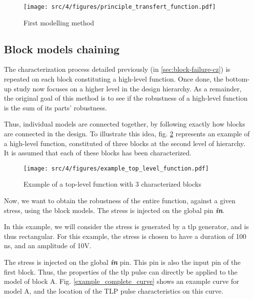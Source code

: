\begin{figure}[!h]
  \centering
  \texttt{[image: src/4/figures/principle\_transfert\_function.pdf]}
  \caption{First modelling method}
  \label{fig:principle-transfert-func}
\end{figure}


\subsection{Block models chaining}
\label{sec:block-chaining}

The characterization process detailed previously (in \ref{sec:block-failure-cz}) is repeated on each block constituting a high-level function.
Once done, the bottom-up study now focuses on a higher level in the design hierarchy.
As a remainder, the original goal of this method is to see if the robustness of a high-level function is the sum of its parts' robustness.

Thus, individual models are connected together, by following exactly how blocks are connected in the design.
To illustrate this idea, fig. \ref{example_toplevel_function} represents an example of a high-level function, constituted of three blocks at the second level of hierarchy.
It is assumed that each of these blocks has been characterized.


\begin{figure}[!h]
  \centering
  \texttt{[image: src/4/figures/example\_top\_level\_function.pdf]}
  \caption{Example of a top-level function with 3 characterized blocks}
  \label{example_toplevel_function}
\end{figure}

Now, we want to obtain the robustness of the entire function, against a given stress, using the block models.
The stress is injected on the global pin \textbf{\textit{in}}.

In this example, we will consider the stress is generated by a \gls{tlp} generator, and is thus rectangular.
For this example, the stress is chosen to have a duration of 100 ns, and an amplitude of 10V.

The stress is injected on the global \textbf{\textit{in}} pin.
This pin is also the input pin of the first block.
Thus, the properties of the \gls{tlp} pulse can directly be applied to the model of block A.
Fig. \ref{example_complete_curve} shows an example curve for model A, and the location of the TLP pulse characteristics on this curve.

